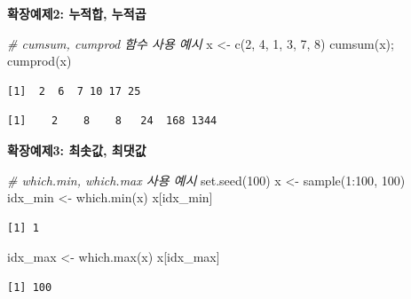 \documentclass[
  11pt,
]{krantz}
\newenvironment{Shaded}{\begin{snugshade}}{\end{snugshade}}
\newcommand{\CommentTok}[1]{\textcolor[rgb]{0.37,0.37,0.37}{\textit{#1}}}
\newcommand{\DecValTok}[1]{\textcolor[rgb]{0.06,0.06,0.06}{#1}}
\newcommand{\FunctionTok}[1]{\textcolor[rgb]{0,0,0}{#1}}
\newcommand{\NormalTok}[1]{#1}
\newcommand{\OtherTok}[1]{\textcolor[rgb]{0.37,0.37,0.37}{#1}}
\newcommand{\SpecialCharTok}[1]{\textcolor[rgb]{0,0,0}{#1}}
\begin{document}
\normalsize

\textbf{확장예제2: 누적합, 누적곱}

\footnotesize

\begin{Shaded}
\begin{Highlighting}[]
\CommentTok{\# cumsum, cumprod 함수 사용 예시}
\NormalTok{x }\OtherTok{\textless{}{-}} \FunctionTok{c}\NormalTok{(}\DecValTok{2}\NormalTok{, }\DecValTok{4}\NormalTok{, }\DecValTok{1}\NormalTok{, }\DecValTok{3}\NormalTok{, }\DecValTok{7}\NormalTok{, }\DecValTok{8}\NormalTok{)}
\FunctionTok{cumsum}\NormalTok{(x); }\FunctionTok{cumprod}\NormalTok{(x)}
\end{Highlighting}
\end{Shaded}

\begin{verbatim}
[1]  2  6  7 10 17 25
\end{verbatim}

\begin{verbatim}
[1]    2    8    8   24  168 1344
\end{verbatim}

\normalsize

\textbf{확장예제3: 최솟값, 최댓값}

\footnotesize

\begin{Shaded}
\begin{Highlighting}[]
\CommentTok{\# which.min, which.max 사용 예시}
\FunctionTok{set.seed}\NormalTok{(}\DecValTok{100}\NormalTok{)}
\NormalTok{x }\OtherTok{\textless{}{-}} \FunctionTok{sample}\NormalTok{(}\DecValTok{1}\SpecialCharTok{:}\DecValTok{100}\NormalTok{, }\DecValTok{100}\NormalTok{)}
\NormalTok{idx\_min }\OtherTok{\textless{}{-}} \FunctionTok{which.min}\NormalTok{(x)}
\NormalTok{x[idx\_min]}
\end{Highlighting}
\end{Shaded}

\begin{verbatim}
[1] 1
\end{verbatim}

\begin{Shaded}
\begin{Highlighting}[]
\NormalTok{idx\_max }\OtherTok{\textless{}{-}} \FunctionTok{which.max}\NormalTok{(x)}
\NormalTok{x[idx\_max]}
\end{Highlighting}
\end{Shaded}

\begin{verbatim}
[1] 100
\end{verbatim}
\end{document}
